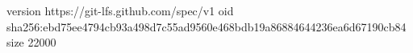 version https://git-lfs.github.com/spec/v1
oid sha256:ebd75ee4794cb93a498d7c55ad9560e468bdb19a86884644236ea6d67190cb84
size 22000
